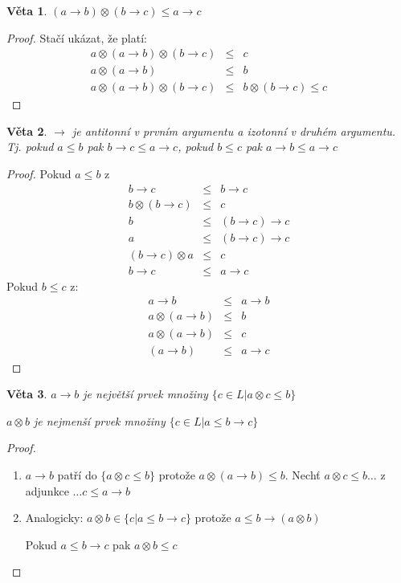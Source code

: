 \documentclass[10pt, a4paper, titlepage]{article}
\theoremstyle{note}
\newtheorem{veta}{Věta}
\begin{document}
\begin{veta}
$(a\rightarrow b) \otimes (b\rightarrow c)\leq a\rightarrow c$
\end{veta}
\begin{proof}
Stačí ukázat, že platí: \begin{eqnarray} a\otimes(a\rightarrow b)\otimes(b\rightarrow c)&\leq& c\nonumber\\
	      a\otimes(a\rightarrow b)&\leq&b\nonumber\\
	      a\otimes(a\rightarrow b)\otimes(b\rightarrow c)&\leq&b\otimes(b\rightarrow c) \leq c\nonumber
  \end{eqnarray}
\end{proof}
\begin{veta}
$\rightarrow$ je antitonní v prvním argumentu a izotonní v druhém argumentu. Tj. pokud $a\leq b$ pak $b\rightarrow c \leq a\rightarrow c$, pokud $b\leq c$ pak $a\rightarrow b\leq a\rightarrow c$
\end{veta}
\begin{proof}
Pokud $a\leq b$ z \begin{eqnarray} b\rightarrow c&\leq& b\rightarrow c\nonumber\\
				 b\otimes (b\rightarrow c)&\leq& c\nonumber\\
				 b &\leq& (b\rightarrow c)\rightarrow c\nonumber\\
				 a &\leq& (b\rightarrow c)\rightarrow c\nonumber\\
				 (b\rightarrow c)\otimes a &\leq&  c\nonumber\\
				 b\rightarrow c &\leq&  a \rightarrow c\nonumber
\end{eqnarray}
Pokud $b\leq c$ z:\begin{eqnarray}a\rightarrow b &\leq&a\rightarrow b \nonumber\\
				  a\otimes (a\rightarrow b) &\leq& b \nonumber\\
				  a\otimes (a\rightarrow b) &\leq& c \nonumber\\
				  (a\rightarrow b) &\leq& a\rightarrow c \nonumber
\end{eqnarray}
\end{proof}
\begin{veta}
$a\rightarrow b$ je největší prvek množiny $\{c\in L | a\otimes c\leq b\}$

\hspace{1.45cm}$a\otimes b$ je nejmenší prvek množiny $\{c\in L | a\leq b\rightarrow c\}$
\end{veta}
\begin{proof}
\begin{enumerate}
\item $a\rightarrow b$ patří do $\{a\otimes c\leq b\}$ protože $a\otimes(a\rightarrow b)\leq b$.
  Nechť $a\otimes c \leq b\dots$ z adjunkce $\dots c\leq a\rightarrow b$

\item Analogicky: $a\otimes b \in \{ c| a\leq b\rightarrow c\}$ protože $a\leq b\rightarrow(a\otimes b)$

Pokud $a\leq b\rightarrow c$ pak $a\otimes b\leq c$
\end{enumerate}
\end{proof}
\end{document}
